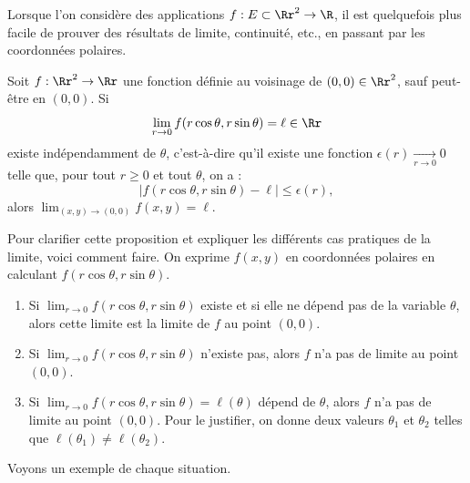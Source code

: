 \documentclass[11pt, class=report,crop=false]{standalone}
\begin{document}
Lorsque l'on considère des applications $f: E \subset \Rr^2 \rightarrow \R$, il est quelquefois plus facile de prouver des résultats de limite, continuité, etc., en passant par les coordonnées polaires.


\begin{proposition}
\label{prop:limrtheta}
Soit $f:\Rr^2\to \Rr$ une fonction définie au voisinage de $(0,0)\in \Rr^2$, sauf peut-être en $(0,0)$. Si
$$\lim _{r\to 0}f(r\cos \theta ,r\sin \theta )=\ell \in \Rr$$
existe indépendamment de $\theta$, c'est-à-dire
qu'il existe une fonction $\epsilon(r)\underset{r\to0}{\longrightarrow}0$ telle que, pour tout $r\ge0$ et tout $\theta$, on a :
$$\big| f(r\cos \theta ,r\sin \theta ) - \ell \big| \le \epsilon(r),$$
alors $\displaystyle \lim _{(x,y)\to (0,0)}f(x,y)=\ell$.
\end{proposition}


Pour clarifier cette proposition et expliquer les différents cas pratiques de la limite, voici comment faire. On exprime $f(x,y)$ en coordonnées polaires en calculant $f(r\cos\theta,r\sin\theta)$.
\begin{enumerate}
  \item Si $\lim_{r\to0} f(r\cos\theta,r\sin\theta)$ existe et si elle ne dépend pas de la variable $\theta$, alors cette limite est la limite de $f$ au point $(0,0)$.
  
  \item Si $\lim_{r\to0} f(r\cos\theta,r\sin\theta)$ n'existe pas, alors $f$ n'a pas de limite au  point $(0,0)$.
  
  \item Si $\lim_{r\to0} f(r\cos\theta,r\sin\theta) = \ell(\theta)$ dépend de $\theta$, alors $f$ n'a pas de limite au  point $(0,0)$. Pour le justifier, on donne deux valeurs $\theta_1$ et $\theta_2$ telles que $\ell(\theta_1) \neq \ell(\theta_2)$.
  
\end{enumerate}


Voyons un exemple de chaque situation.
\end{document}
